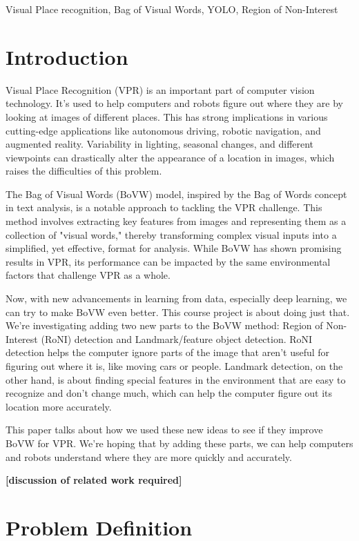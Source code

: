 \documentclass[conference]{IEEEtran}
\begin{document}
\begin{IEEEkeywords}
Visual Place recognition, Bag of Visual Words, YOLO, Region of Non-Interest
\end{IEEEkeywords}

\section{Introduction}

Visual Place Recognition (VPR) is an important part of computer vision technology. It's used to help computers and robots figure out where they are by looking at images of different places. This has strong implications in various cutting-edge applications like autonomous driving, robotic navigation, and augmented reality. Variability in lighting, seasonal changes, and different viewpoints can drastically alter the appearance of a location in images, which raises the difficulties of this problem.

The Bag of Visual Words (BoVW) model, inspired by the Bag of Words concept in text analysis, is a notable approach to tackling the VPR challenge. This method involves extracting key features from images and representing them as a collection of "visual words," thereby transforming complex visual inputs into a simplified, yet effective, format for analysis. While BoVW has shown promising results in VPR, its performance can be impacted by the same environmental factors that challenge VPR as a whole.

Now, with new advancements in learning from data, especially deep learning, we can try to make BoVW even better. This course project is about doing just that. We're investigating adding two new parts to the BoVW method: Region of Non-Interest (RoNI) detection and Landmark/feature object detection. RoNI detection helps the computer ignore parts of the image that aren't useful for figuring out where it is, like moving cars or people. Landmark detection, on the other hand, is about finding special features in the environment that are easy to recognize and don't change much, which can help the computer figure out its location more accurately.

This paper talks about how we used these new ideas to see if they improve BoVW for VPR. We're hoping that by adding these parts, we can help computers and robots understand where they are more quickly and accurately.


\textbf{[discussion of related work required]}

\section{Problem Definition}
\end{document}
